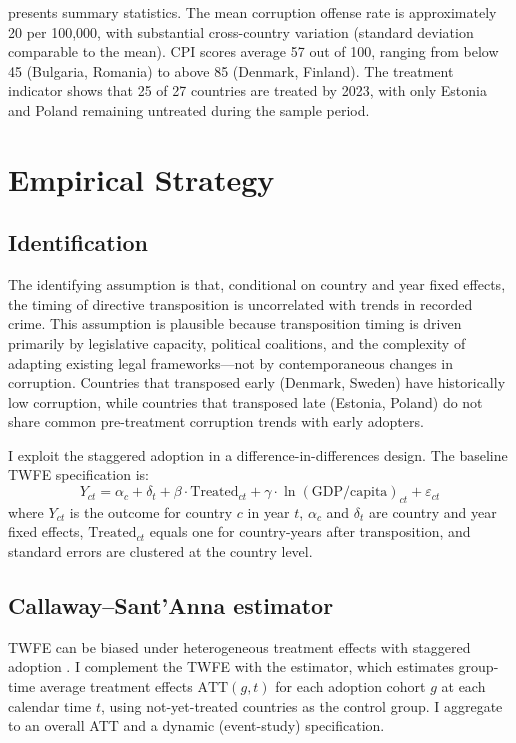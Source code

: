 \documentclass[12pt]{article}
\begin{document}


 presents summary statistics. The mean corruption offense rate is approximately 20 per 100,000, with substantial cross-country variation (standard deviation comparable to the mean). CPI scores average 57 out of 100, ranging from below 45 (Bulgaria, Romania) to above 85 (Denmark, Finland). The treatment indicator shows that 25 of 27 countries are treated by 2023, with only Estonia and Poland remaining untreated during the sample period.

\section{Empirical Strategy}

\subsection{Identification}

The identifying assumption is that, conditional on country and year fixed effects, the timing of directive transposition is uncorrelated with trends in recorded crime. This assumption is plausible because transposition timing is driven primarily by legislative capacity, political coalitions, and the complexity of adapting existing legal frameworks---not by contemporaneous changes in corruption. Countries that transposed early (Denmark, Sweden) have historically low corruption, while countries that transposed late (Estonia, Poland) do not share common pre-treatment corruption trends with early adopters.

I exploit the staggered adoption in a difference-in-differences design. The baseline TWFE specification is:
\begin{equation}
Y_{ct} = \alpha_c + \delta_t + \beta \cdot \text{Treated}_{ct} + \gamma \cdot \ln(\text{GDP/capita})_{ct} + \varepsilon_{ct}
\end{equation}
where $Y_{ct}$ is the outcome for country $c$ in year $t$, $\alpha_c$ and $\delta_t$ are country and year fixed effects, $\text{Treated}_{ct}$ equals one for country-years after transposition, and standard errors are clustered at the country level.

\subsection{Callaway--Sant'Anna estimator}

TWFE can be biased under heterogeneous treatment effects with staggered adoption \citep{goodman_bacon_2021, de_chaisemartin_dhaultfoeuille_2020}. I complement the TWFE with the \citet{callaway_santanna_2021} estimator, which estimates group-time average treatment effects $\text{ATT}(g, t)$ for each adoption cohort $g$ at each calendar time $t$, using not-yet-treated countries as the control group. I aggregate to an overall ATT and a dynamic (event-study) specification.
\end{document}
